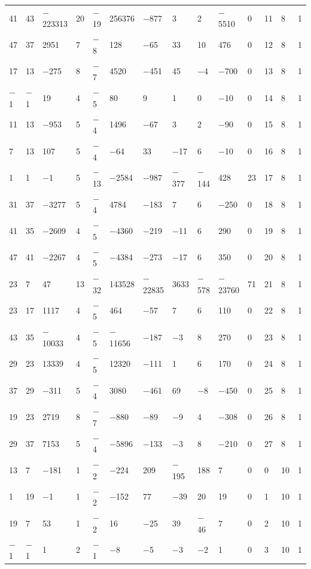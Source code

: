\documentclass[10pt,a4paper]{amsart}
\numberwithin{equation}{section}
\theoremstyle{definition}
\numberwithin{table}{section}
\begin{document}
{\begin{paracol}{3}
\begin{supertabular}{|w{c}{.32cm}w{c}{.32cm}w{c}{.32cm}@{\hspace{.5cm}}w{c}{.2cm}w{c}{.2cm}|@{\hspace{\tabcolsep}}HHHHHHw{c}{.17cm}w{c}{.17cm}w{c}{.17cm}|}
			41 & 43 & $-$223313 & 20 & $-$19 & 256376 & $-$877 & 3 & 2 & $-$5510 & 0 & 11 & 8 & 1 \\
			47 & 37 & 2951 & 7 & $-$8 & 128 & $-$65 & 33 & 10 & 476 & 0 & 12 & 8 & 1 \\
			17 & 13 & $-$275 & 8 & $-$7 & 4520 & $-$451 & 45 & $-$4 & $-$700 & 0 & 13 & 8 & 1 \\
			$-$1 & $-$1 & 19 & 4 & $-$5 & 80 & 9 & 1 & 0 & $-$10 & 0 & 14 & 8 & 1 \\
			11 & 13 & $-$953 & 5 & $-$4 & 1496 & $-$67 & 3 & 2 & $-$90 & 0 & 15 & 8 & 1 \\
			7 & 13 & 107 & 5 & $-$4 & $-$64 & 33 & $-$17 & 6 & $-$10 & 0 & 16 & 8 & 1 \\
			1 & 1 & $-$1 & 5 & $-$13 & $-$2584 & $-$987 & $-$377 & $-$144 & 428 & 23 & 17 & 8 & 1 \\
			31 & 37 & $-$3277 & 5 & $-$4 & 4784 & $-$183 & 7 & 6 & $-$250 & 0 & 18 & 8 & 1 \\
			41 & 35 & $-$2609 & 4 & $-$5 & $-$4360 & $-$219 & $-$11 & 6 & 290 & 0 & 19 & 8 & 1 \\
			47 & 41 & $-$2267 & 4 & $-$5 & $-$4384 & $-$273 & $-$17 & 6 & 350 & 0 & 20 & 8 & 1 \\
			23 & 7 & 47 & 13 & $-$32 & 143528 & $-$22835 & 3633 & $-$578 & $-$23760 & 71 & 21 & 8 & 1 \\
			23 & 17 & 1117 & 4 & $-$5 & 464 & $-$57 & 7 & 6 & 110 & 0 & 22 & 8 & 1 \\
			43 & 35 & $-$10033 & 4 & $-$5 & $-$11656 & $-$187 & $-$3 & 8 & 270 & 0 & 23 & 8 & 1 \\
			29 & 23 & 13339 & 4 & $-$5 & 12320 & $-$111 & 1 & 6 & 170 & 0 & 24 & 8 & 1 \\
			37 & 29 & $-$311 & 5 & $-$4 & 3080 & $-$461 & 69 & $-$8 & $-$450 & 0 & 25 & 8 & 1 \\
			19 & 23 & 2719 & 8 & $-$7 & $-$880 & $-$89 & $-$9 & 4 & $-$308 & 0 & 26 & 8 & 1 \\
			29 & 37 & 7153 & 5 & $-$4 & $-$5896 & $-$133 & $-$3 & 8 & $-$210 & 0 & 27 & 8 & 1 \\
			13 & 7 & $-$181 & 1 & $-$2 & $-$224 & 209 & $-$195 & 188 & 7 & 0 & 0 & 10 & 1 \\
			1 & 19 & $-$1 & 1 & $-$2 & $-$152 & 77 & $-$39 & 20 & 19 & 0 & 1 & 10 & 1 \\
			19 & 7 & 53 & 1 & $-$2 & 16 & $-$25 & 39 & $-$46 & 7 & 0 & 2 & 10 & 1 \\
			$-$1 & $-$1 & 1 & 2 & $-$1 & $-$8 & $-$5 & $-$3 & $-$2 & 1 & 0 & 3 & 10 & 1 \\

\end{supertabular}
\end{paracol}}
\end{document}
